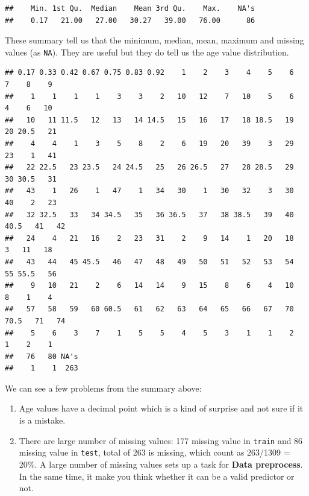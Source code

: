 \documentclass[
]{book}
\newenvironment{Shaded}{\begin{snugshade}}{\end{snugshade}}
\newcommand{\CommentTok}[1]{\textcolor[rgb]{0.56,0.35,0.01}{\textit{#1}}}
\newcommand{\KeywordTok}[1]{\textcolor[rgb]{0.13,0.29,0.53}{\textbf{#1}}}
\newcommand{\NormalTok}[1]{#1}
\newcommand{\OperatorTok}[1]{\textcolor[rgb]{0.81,0.36,0.00}{\textbf{#1}}}
\begin{document}
\begin{verbatim}
##    Min. 1st Qu.  Median    Mean 3rd Qu.    Max.    NA's 
##    0.17   21.00   27.00   30.27   39.00   76.00      86
\end{verbatim}

These summary tell us that the minimum, median, mean, maximum and missing values (as \texttt{NA}). They are useful but they do tell us the age value distribution.

\begin{Shaded}
\end{Shaded}

\begin{verbatim}
## 0.17 0.33 0.42 0.67 0.75 0.83 0.92    1    2    3    4    5    6    7    8    9 
##    1    1    1    1    3    3    2   10   12    7   10    5    6    4    6   10 
##   10   11 11.5   12   13   14 14.5   15   16   17   18 18.5   19   20 20.5   21 
##    4    4    1    3    5    8    2    6   19   20   39    3   29   23    1   41 
##   22 22.5   23 23.5   24 24.5   25   26 26.5   27   28 28.5   29   30 30.5   31 
##   43    1   26    1   47    1   34   30    1   30   32    3   30   40    2   23 
##   32 32.5   33   34 34.5   35   36 36.5   37   38 38.5   39   40 40.5   41   42 
##   24    4   21   16    2   23   31    2    9   14    1   20   18    3   11   18 
##   43   44   45 45.5   46   47   48   49   50   51   52   53   54   55 55.5   56 
##    9   10   21    2    6   14   14    9   15    8    6    4   10    8    1    4 
##   57   58   59   60 60.5   61   62   63   64   65   66   67   70 70.5   71   74 
##    5    6    3    7    1    5    5    4    5    3    1    1    2    1    2    1 
##   76   80 NA's 
##    1    1  263
\end{verbatim}

We can see a few problems from the summary above:

\begin{enumerate}
\def\labelenumi{\arabic{enumi}.}
\item
  Age values have a decimal point which is a kind of surprise and not sure if it is a mistake.
\item
  There are large number of missing values: 177 missing value in \texttt{train} and 86 missing value in \texttt{test}, total of 263 is missing, which count as 263/1309 = 20\%. A large number of missing values sets up a task for \textbf{Data preprocess}. In the same time, it make you think whether it can be a valid predictor or not.
\end{enumerate}
\end{document}
